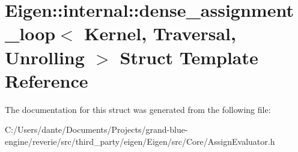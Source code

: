 \hypertarget{struct_eigen_1_1internal_1_1dense__assignment__loop}{}\section{Eigen\+::internal\+::dense\+\_\+assignment\+\_\+loop$<$ Kernel, Traversal, Unrolling $>$ Struct Template Reference}
\label{struct_eigen_1_1internal_1_1dense__assignment__loop}


The documentation for this struct was generated from the following file\+:\begin{DoxyCompactItemize}
\item 
C\+:/\+Users/dante/\+Documents/\+Projects/grand-\/blue-\/engine/reverie/src/third\+\_\+party/eigen/\+Eigen/src/\+Core/Assign\+Evaluator.\+h\end{DoxyCompactItemize}
